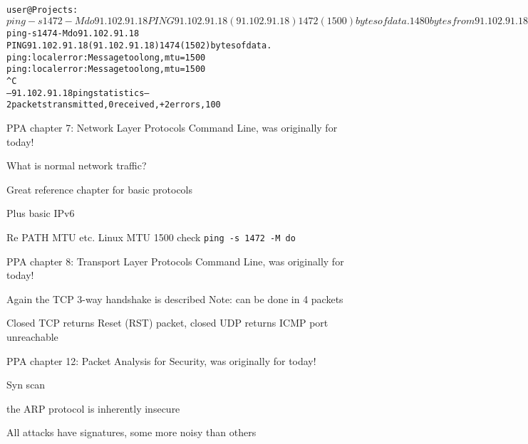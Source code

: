 \documentclass[Screen16to9,17pt]{foils}
\begin{document}

\begin{alltt}\footnotesize
user@Projects:~$ ping -s 1472 -M do 91.102.91.18
PING 91.102.91.18 (91.102.91.18) 1472(1500) bytes of data.
1480 bytes from 91.102.91.18: icmp_seq=1 ttl=244 time=7.43 ms
1480 bytes from 91.102.91.18: icmp_seq=2 ttl=244 time=7.20 ms
...
user@Projects:~$ ping -s 1474 -M do 91.102.91.18
PING 91.102.91.18 (91.102.91.18) 1474(1502) bytes of data.
ping: local error: Message too long, mtu=1500
ping: local error: Message too long, mtu=1500
^C
--- 91.102.91.18 ping statistics ---
2 packets transmitted, 0 received, +2 errors, 100% packet loss, time 1025ms
\end{alltt}

\begin{list1}
\item PPA chapter 7: Network Layer Protocols
Command Line, was originally for today!
\begin{list2}
\item What is normal network traffic?
\item Great reference chapter for basic protocols
\item Plus basic IPv6
\item Re PATH MTU etc. Linux MTU 1500 check \verb+ping -s 1472 -M do+
\end{list2}
\end{list1}



\begin{list1}
\item PPA chapter 8: Transport Layer Protocols
Command Line, was originally for today!
\begin{list2}
\item Again the TCP 3-way handshake is described Note: can be done in 4 packets
\item Closed TCP returns Reset (RST) packet, closed UDP returns ICMP port unreachable
\end{list2}
\end{list1}




\begin{list1}
\item PPA chapter 12: Packet Analysis for Security, was originally for today!
\begin{list2}
\item Syn scan
\item the ARP protocol is inherently insecure
\item All attacks have signatures, some more noisy than others
\end{list2}
\end{list1}
\end{document}
